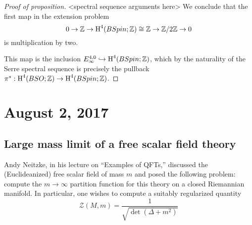 \documentclass{amsart}
\begin{document}
\begin{proof}[Proof of proposition]
    <spectral sequence arguments here>
    We conclude that the first map in the extension problem
    \begin{equation*}
        0\to \mathbb{Z} \to \operatorname{H}^4(BSpin;\mathbb{Z})\cong\mathbb{Z} \to \mathbb{Z}/2\mathbb{Z} \to 0
    \end{equation*}
    is multiplication by two.

    This map is the inclusion $E_\infty^{4,0}\hookrightarrow \operatorname{H}^4(BSpin;\mathbb{Z})$, which
    by the naturality of the Serre spectral sequence is precisely the pullback
    $\pi^*:\operatorname{H}^4(BSO;\mathbb{Z})\to \operatorname{H}^4(BSpin;\mathbb{Z})$.
\end{proof}

\section{August 2, 2017}

\subsection{Large mass limit of a free scalar field theory}

Andy Neitzke, in his lecture on ``Examples of QFTs,'' discussed the (Euclideanized) free scalar field
of mass $m$ and posed the following problem: compute the $m\to\infty$ partition function
for this theory on a closed Riemannian manifold. In particular, one wishes to compute a
suitably regularized quantity
\begin{equation*}
    \mathcal{Z}(M,m) = \frac{1}{\sqrt{\det (\Delta + m^2)}}
\end{equation*}
\end{document}
